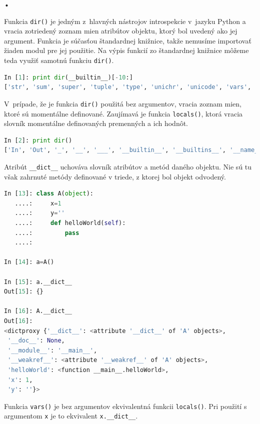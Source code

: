 \documentclass[11pt,oneside,final]{fithesis2}
\begin{document}
\begin{list}{•}{}
		\item 
			Funkcia \texttt{dir()} je jedným z~hlavných nástrojov introspekcie v~jazyku Python a vracia zotriedený zoznam mien atribútov objektu, ktorý bol uvedený ako jej argument. Funkcia je súčasťou štandardnej knižnice, takže nemusíme importovať žiaden modul pre jej použitie. Na výpis funkcií zo štandardnej knižnice môžeme teda využiť samotnú funkciu \texttt{dir()}.
			

\begin{lstlisting}[language=python]
In [1]: print dir(__builtin__)[-10:]
['str', 'sum', 'super', 'tuple', 'type', 'unichr', 'unicode', 'vars', 'xrange', 'zip']
\end{lstlisting}

			 V~prípade, že je funkcia \texttt{dir()} použitá bez argumentov, vracia zoznam mien, ktoré sú momentálne definované. Zaujímavá je funkcia \texttt{locals()}, ktorá vracia slovník momentálne definovaných premenných a ich hodnôt.
			 
			 
			 

\begin{lstlisting}[language=python]
In [2]: print dir()
['In', 'Out', '_', '__', '___', '__builtin__', '__builtins__', '__name__', '_dh', '_i', '_i1', '_i2', '_ih', '_ii', '_iii', '_oh', '_sh', 'exit', 'get_ipython', 'help', 'quit']

\end{lstlisting}

		\item 
			Atribút \texttt{\_\_dict\_\_} uchováva slovník atribútov a metód daného objektu. Nie sú tu však zahrnuté metódy definované v triede, z ktorej bol objekt odvodený.
			
\begin{lstlisting}[language=python]
In [13]: class A(object):
   ....:     x=1
   ....:     y=''
   ....:     def helloWorld(self):
   ....:         pass
   ....:     

In [14]: a=A()

In [15]: a.__dict__
Out[15]: {}

In [16]: A.__dict__
Out[16]: 
<dictproxy {'__dict__': <attribute '__dict__' of 'A' objects>,
 '__doc__': None,
 '__module__': '__main__',
 '__weakref__': <attribute '__weakref__' of 'A' objects>,
 'helloWorld': <function __main__.helloWorld>,
 'x': 1,
 'y': ''}>
\end{lstlisting}

		\item 
			Funkcia \texttt{vars()} je bez argumentov ekvivalentná funkcii \texttt{locals()}. Pri použití s argumentom \texttt{x} je to ekvivalent \texttt{x.\_\_dict\_\_}.
	


\end{list}
\end{document}
